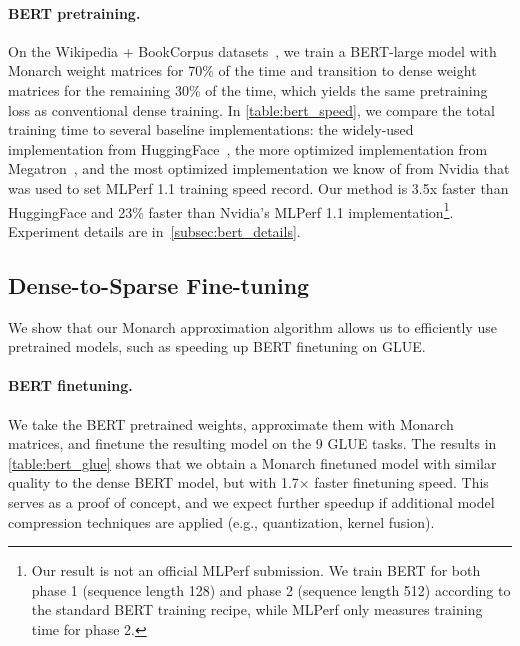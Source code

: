\paragraph{BERT pretraining.} On the Wikipedia + BookCorpus datasets~\citep{zhu2015aligning}, we train a BERT-large model with Monarch weight matrices for 70\% of the time and transition to dense weight matrices for the remaining 30\% of the time, which yields the same pretraining loss as conventional dense training. In \ref{table:bert_speed}, we compare the total training time to several baseline implementations: the widely-used implementation from HuggingFace~\citep{wolf-etal-2020-transformers}, the more optimized implementation from Megatron~\citep{shoeybi2019megatron}, and the most optimized implementation we know of from Nvidia that was used to set MLPerf 1.1 training speed record. Our method is 3.5x faster than HuggingFace and 23\% faster than Nvidia's MLPerf 1.1 implementation\footnote{Our result is not an official MLPerf submission. We train BERT for both phase 1 (sequence length 128) and phase 2 (sequence length 512) according to the standard BERT training recipe\cite{devlin2018bert}, while MLPerf only measures training time for phase 2.}. Experiment details are in~\ref{subsec:bert_details}.

\subsection{Dense-to-Sparse Fine-tuning}
\label{subsec:finetuning}

We show that our Monarch approximation algorithm allows us to efficiently use pretrained models, such as speeding up BERT finetuning on GLUE.

\paragraph{BERT finetuning.} We take the BERT pretrained weights, approximate them with Monarch matrices, and finetune the resulting model on the 9 GLUE tasks. The results in \ref{table:bert_glue} shows that we obtain a Monarch finetuned model with similar quality to the dense BERT model, but with 1.7$\times$ faster finetuning speed. This serves as a proof of concept, and we expect further speedup if additional model compression techniques are applied (e.g., quantization, kernel fusion).

